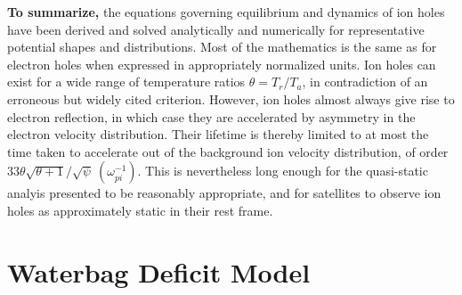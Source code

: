 \documentclass[aip,pop,article-title]{revtex4-2}
\begin{document}
\textbf{To summarize,} the equations governing equilibrium and
dynamics of ion holes have been derived and solved analytically and
numerically for representative potential shapes and
distributions. Most of the mathematics is the same as for electron
holes when expressed in appropriately normalized units. Ion holes can
exist for a wide range of temperature ratios $\theta=T_r/T_a$, in
contradiction of an erroneous but widely cited criterion. However, ion
holes almost always give rise to electron reflection, in which case
they are accelerated by asymmetry in the electron velocity
distribution. Their lifetime is thereby limited to at most the time
taken to accelerate out of the background ion velocity distribution,
of order $33\theta\sqrt{\theta+1}/\sqrt{\psi}\
(\omega_{pi}^{-1})$. This is nevertheless long enough for the
quasi-static analyis presented to be reasonably appropriate, and for
satellites to observe ion holes as approximately static in their rest
frame.

\appendix
\section{Waterbag Deficit Model}\label{appa}
\end{document}
